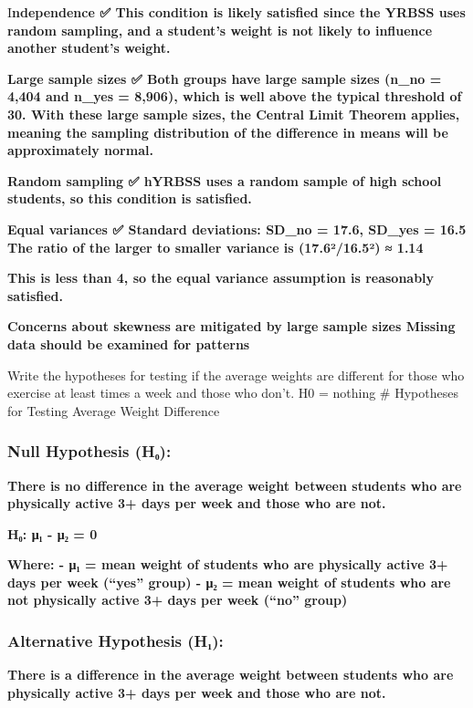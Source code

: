 \documentclass[
]{article}
\begin{document}
I\textbf{ndependence ✅ This condition is likely satisfied since the
YRBSS uses random sampling, and a student's weight is not likely to
influence another student's weight.}

\textbf{Large sample sizes ✅ Both groups have large sample sizes (n\_no
= 4,404 and n\_yes = 8,906), which is well above the typical threshold
of 30. With these large sample sizes, the Central Limit Theorem applies,
meaning the sampling distribution of the difference in means will be
approximately normal.}

\textbf{Random sampling ✅ hYRBSS uses a random sample of high school
students, so this condition is satisfied.}

\textbf{Equal variances ✅ Standard deviations: SD\_no = 17.6, SD\_yes =
16.5 The ratio of the larger to smaller variance is (17.6²/16.5²) ≈
1.14}

\textbf{This is less than 4, so the equal variance assumption is
reasonably satisfied.}

\textbf{Concerns about skewness are mitigated by large sample sizes
Missing data should be examined for patterns}

Write the hypotheses for testing if the average weights are different
for those who exercise at least times a week and those who don't. H0 =
nothing \# Hypotheses for Testing Average Weight Difference

\subsubsection{\texorpdfstring{\textbf{Null Hypothesis
(H₀):}}{Null Hypothesis (H₀):}}\label{null-hypothesis-hux2080}

\textbf{There is no difference in the average weight between students
who are physically active 3+ days per week and those who are not.}

\textbf{H₀: μ₁ - μ₂ = 0}

\textbf{Where: - μ₁ = mean weight of students who are physically active
3+ days per week (``yes'' group) - μ₂ = mean weight of students who are
not physically active 3+ days per week (``no'' group)}

\subsubsection{\texorpdfstring{\textbf{Alternative Hypothesis
(H₁):}}{Alternative Hypothesis (H₁):}}\label{alternative-hypothesis-hux2081}

\textbf{There is a difference in the average weight between students who
are physically active 3+ days per week and those who are not.}
\end{document}
